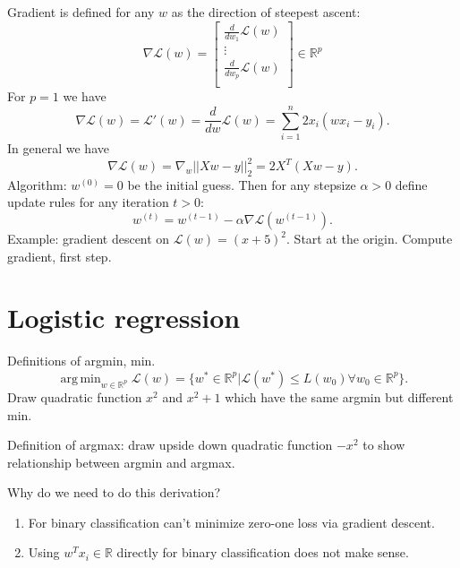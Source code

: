\documentclass{article}
\DeclareMathOperator*{\argmin}{arg\,min}
\begin{document}
Gradient is defined for any $w$ as the direction of steepest ascent:
\begin{equation}
  \nabla \mathcal L(w) = \left[\begin{array}{c}
              \frac{d}{dw_1} \mathcal L(w)\\
              \vdots \\
              \frac{d}{dw_p} \mathcal L(w)\\
\end{array}\right]\in\mathbb R^{p}
\end{equation}
For $p=1$ we have 
\begin{equation}
  \nabla \mathcal L(w) = \mathcal L'(w) = \frac{d}{dw}\mathcal L(w) = 
  \sum_{i=1}^n 2x_i(w x_i - y_i).
\end{equation}
In general we have
\begin{equation}
  \nabla \mathcal L(w) = 
  \nabla_w ||Xw - y||_2^2 = 
  2X^T(Xw-y).
\end{equation}
Algorithm: $w^{(0)}=0$ be the initial guess.
Then for any stepsize $\alpha>0$ define update rules for any iteration $t>0$:
\begin{equation}
  w^{(t)} = w^{(t-1)} - \alpha \nabla \mathcal L(w^{(t-1)}).
\end{equation}
Example: gradient descent on $\mathcal L(w)=(x+5)^2$. Start at the
origin. Compute gradient, first step.

\section{Logistic regression}

Definitions of argmin, min.
\begin{equation*}
  \argmin_{w\in\mathbb R^p}\mathcal L(w) = \{w^*\in\mathbb R^p|\mathcal L(w^*)\leq L(w_0) \forall w_0\in\mathbb R^p\}.
\end{equation*}
Draw quadratic function $x^2$ and $x^2+1$ which have the same argmin
but different min.

Definition of argmax: draw upside down quadratic function $-x^2$ to
show relationship between argmin and argmax.

Why do we need to do this derivation? 
\begin{enumerate}
\item For binary classification can't minimize zero-one loss via gradient
descent.
\item Using $w^T x_i\in\mathbb R$ directly for binary classification
  does not make sense.
\end{enumerate}
\end{document}

